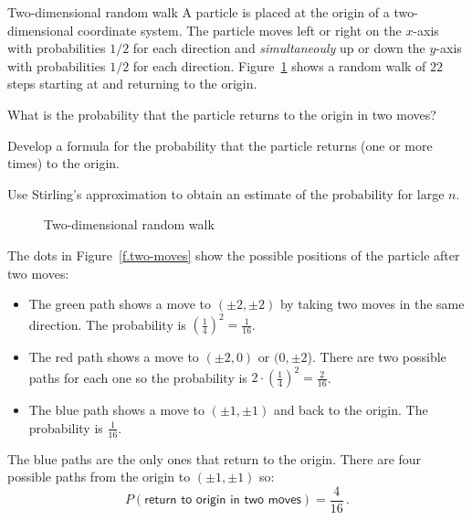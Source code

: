 \begin{prob}{Two-dimensional random walk}
A particle is placed at the origin of a two-dimensional coordinate system. The particle moves left or right on the $x$-axis with probabilities $1/2$ for each direction and \emph{simultaneouly} up or down the $y$-axis with probabilities $1/2$ for each direction. Figure~\ref{f.2d-random-walk} shows a random walk of $22$ steps starting at and returning to the origin.

 What is the probability that the particle returns to the origin in two moves?

 Develop a formula for the probability that the particle returns (one or more times) to the origin.

 Use Stirling's approximation to obtain an estimate of the probability for large $n$.

\begin{figure}[t]
\begin{center}
\end{center}
\caption{Two-dimensional random walk}\label{f.2d-random-walk}
\end{figure}
\end{prob}

\solution{}

The dots in Figure~\ref{f.two-moves} show the possible positions of the particle after two moves:
\begin{itemize}
\item The green path shows a move to $(\pm 2, \pm 2)$ by taking two moves in the same direction. The probability is $\left(\frac{1}{4}\right)^2= \frac{1}{16}$.
\item The red path shows a move to $(\pm 2,0)$ or $(0,\pm 2$). There are two possible paths for each one so the probability is $2\cdot\left(\frac{1}{4}\right)^2= \frac{2}{16}$.
\item The blue path shows a move to $(\pm 1,\pm 1)$ and back to the origin. The probability is $\frac{1}{16}$.
\end{itemize}
The blue paths are the only ones that return to the origin. There are four possible paths from the origin to $(\pm 1,\pm 1)$ so:
\[
P(\textsf{return to origin in two moves})=\frac{4}{16}\,.
\]

